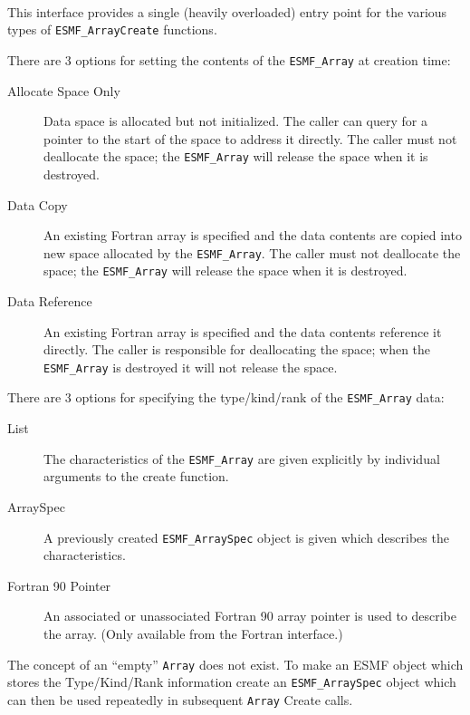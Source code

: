  
\mbox{}\hrulefill\ 
 

   This interface provides a single (heavily overloaded) entry point for
   the various types of {\tt ESMF\_ArrayCreate} functions.
  
   There are 3 options for setting the contents of the {\tt ESMF\_Array}
   at creation time:
   \begin{description}
   \item[Allocate Space Only]
   Data space is allocated but not initialized. The caller can query
   for a pointer to the start of the space to address it directly.
   The caller must not deallocate the space; the
   {\tt ESMF\_Array} will release the space when it is destroyed.
   \item[Data Copy]
   An existing Fortran array is specified and the data contents are copied
   into new space allocated by the {\tt ESMF\_Array}.
   The caller must not deallocate the space; the
   {\tt ESMF\_Array} will release the space when it is destroyed.
   \item[Data Reference]
   An existing Fortran array is specified and the data contents reference
   it directly. The caller is responsible for deallocating the space;
   when the {\tt ESMF\_Array} is destroyed it will not release the space.
   \end{description}
  
   There are 3 options for
   specifying the type/kind/rank of the {\tt ESMF\_Array} data:
   \begin{description}
   \item[List]
   The characteristics of the {\tt ESMF\_Array} are given explicitly
   by individual arguments to the create function.
   \item[ArraySpec]
   A previously created {\tt ESMF\_ArraySpec} object is given which
   describes the characteristics.
   \item[Fortran 90 Pointer]
   An associated or unassociated Fortran 90 array pointer is used to
   describe the array.
   (Only available from the Fortran interface.)
   \end{description}
  
   The concept of an ``empty'' {\tt Array} does not exist. To make an
   ESMF object which stores the Type/Kind/Rank information create an
   {\tt ESMF\_ArraySpec} object which can then be used repeatedly in
   subsequent {\tt Array} Create calls.
  
